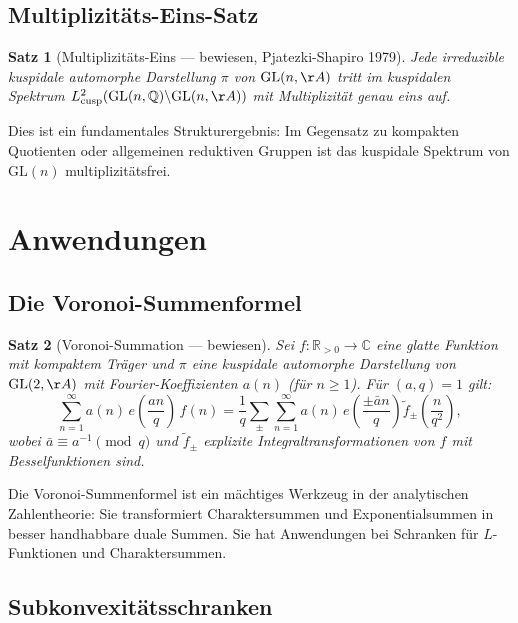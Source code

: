 \documentclass[12pt,a4paper]{amsart}
\newtheorem{theorem}{Satz}[section]
\theoremstyle{definition}
\newcommand{\QQ}{\mathbb{Q}}
\newcommand{\RR}{\mathbb{R}}
\newcommand{\CC}{\mathbb{C}}
\newcommand{\GL}{\mathrm{GL}}
\begin{document}
\subsection{Multiplizitäts-Eins-Satz}

\begin{theorem}[Multiplizitäts-Eins — bewiesen, Pjatezki-Shapiro 1979]
Jede irreduzible kuspidale automorphe Darstellung $\pi$ von $\GL(n,\AA)$
tritt im kuspidalen Spektrum $L^2_{\mathrm{cusp}}(\GL(n,\QQ) \backslash \GL(n,\AA))$
mit Multiplizität genau eins auf.
\end{theorem}

Dies ist ein fundamentales Strukturergebnis: Im Gegensatz zu kompakten Quotienten
oder allgemeinen reduktiven Gruppen ist das kuspidale Spektrum von $\GL(n)$ multiplizitätsfrei.

\section{Anwendungen}
\label{sec:anwendungen}

\subsection{Die Voronoi-Summenformel}

\begin{theorem}[Voronoi-Summation — bewiesen]
\label{satz:voronoi}
Sei $f : \RR_{>0} \to \CC$ eine glatte Funktion mit kompaktem Träger und
$\pi$ eine kuspidale automorphe Darstellung von $\GL(2,\AA)$ mit Fourier-Koeffizienten
$a(n)$ (für $n \geq 1$). Für $(a, q) = 1$ gilt:
\[
\sum_{n=1}^\infty a(n)\, e\!\left(\frac{an}{q}\right)\, f(n)
= \frac{1}{q} \sum_{\pm} \sum_{n=1}^\infty a(n)\, e\!\left(\frac{\pm \bar a n}{q}\right) \tilde f_\pm\!\!\left(\frac{n}{q^2}\right),
\]
wobei $\bar a \equiv a^{-1} \pmod{q}$ und $\tilde f_\pm$ explizite Integraltransformationen
von $f$ mit Besselfunktionen sind.
\end{theorem}

Die Voronoi-Summenformel ist ein mächtiges Werkzeug in der analytischen Zahlentheorie:
Sie transformiert Charaktersummen und Exponentialsummen in besser handhabbare duale
Summen. Sie hat Anwendungen bei Schranken für $L$-Funktionen und Charaktersummen.

\subsection{Subkonvexitätsschranken}
\end{document}
